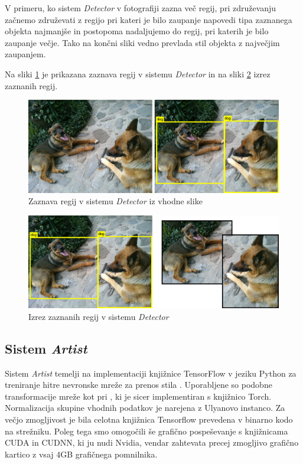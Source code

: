 \documentclass[runningheads,a4paper]{llncs}
\begin{document}
V primeru, ko sistem \textit{Detector} v fotografiji zazna več regij, pri združevanju začnemo združevati z regijo pri kateri je bilo zaupanje napovedi tipa zaznanega objekta najmanjše in postopoma nadaljujemo do regij, pri katerih je bilo zaupanje večje. Tako na končni sliki vedno prevlada stil objekta z največjim zaupanjem.

Na sliki \ref{fig:input_detector} je prikazana zaznava regij v sistemu \textit{Detector} in na sliki \ref{fig:detector} izrez zaznanih regij.

\begin{figure}[H]
\centering
\includegraphics[width=\textwidth, center]{figures/neural_example/input_detector.png}
\caption{Zaznava regij v sistemu \textit{Detector} iz vhodne slike}
\label{fig:input_detector}
\end{figure}

\begin{figure}[H]
\centering
\includegraphics[width=\textwidth, center]{figures/neural_example/detector.png}
\caption{Izrez zaznanih regij v sistemu \textit{Detector}}
\label{fig:detector}
\end{figure}

\subsection{Sistem \textit{Artist}}
Sistem \textit{Artist} temelji na implementaciji knjižnice TensorFlow v jeziku Python za treniranje hitre nevronske mreže za prenos stila \cite{neural-style-fast}. Uporabljene so podobne transformacije mreže kot pri \cite{neural-style-johnson}, ki je sicer implementiran s knjižnico Torch. Normalizacija skupine vhodnih podatkov je narejena z Ulyanovo instanco. Za večjo zmogljivost je bila celotna knjižnica Tensorflow prevedena v binarno kodo na strežniku. Poleg tega smo omogočili še grafično pospeševanje s knjižnicama CUDA in CUDNN, ki ju nudi Nvidia, vendar zahtevata precej zmogljivo grafično kartico z vsaj 4GB grafičnega pomnilnika.
\end{document}
